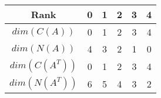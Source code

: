 \begin{center}
\begin{tabular}{ c | c c c c c}
\hline
 Rank & 0& 1 & 2 & 3 & 4 \\ 
 \hline
 $dim(C(A))$ & 0 & 1 & 2  & 3 & 4\\  
 $dim(N(A))$ & 4 & 3 & 2 & 1 & 0 \\
 $dim(C(A^T))$ & 0 & 1 & 2 & 3 & 4 \\
 $dim(N(A^T))$ & 6 & 5 & 4 & 3 & 2\\ 
 
\end{tabular}
\end{center}